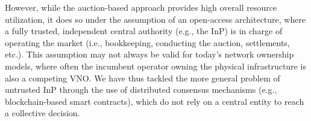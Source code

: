 However, while the auction-based approach provides high overall resource utilization, it does so under the assumption of an open-access architecture, where a fully trusted, independent central authority (e.g., the \ac{InP}) is in charge of operating the market (i.e., bookkeeping, conducting the auction, settlements, etc.). This assumption may not always be valid for today's network ownership models, where often the incumbent operator owning the physical infrastructure is also a competing \ac{VNO}.
We have thus tackled the more general problem of untrusted \ac{InP} through the use of distributed consensus mechanisms (e.g., blockchain-based smart contracts), which do not rely on a central entity to reach a collective decision.


